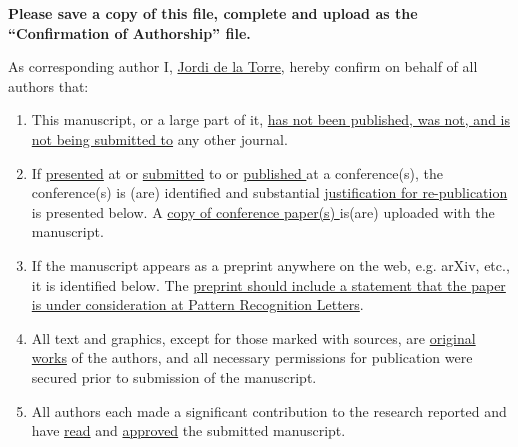 \documentclass[times,twocolumn,final,authoryear]{elsarticle}
\begin{document}
\thispagestyle{empty}
                                                             
\begin{table}[!th]

\begin{minipage}{.9\textwidth}
\baselineskip12pt
\ifpreprint
  \vspace*{1pc}
\else
  \vspace*{-6pc}
\fi

\vskip6pt


\vskip1pc


{\bf Please save a copy of this file, complete and upload as the 
``Confirmation of Authorship'' file.}

\vskip1pc

As corresponding author 
I, \underline{Jordi de la Torre}, 
hereby confirm on behalf of all authors that:

\vskip1pc

\begin{enumerate}
\itemsep=3pt
\item This manuscript, or a large part of it, \underline {has not been
published,  was not, and is not being submitted to} any other journal. 

\item If \underline {presented} at or \underline {submitted} to or
\underline  {published }at a conference(s), the conference(s) is (are)
identified and  substantial \underline {justification for
re-publication} is presented  below. A \underline {copy of
conference paper(s) }is(are) uploaded with the  manuscript.

\item If the manuscript appears as a preprint anywhere on the web, e.g.
arXiv,  etc., it is identified below. The \underline {preprint should
include a  statement that the paper is under consideration at Pattern
Recognition  Letters}.

\item All text and graphics, except for those marked with sources, are
\underline  {original works} of the authors, and all necessary
permissions for  publication were secured prior to submission of the
manuscript.

\item All authors each made a significant contribution to the research
reported  and have \underline {read} and \underline {approved} the
submitted  manuscript. 
\end{enumerate}


\end{minipage}
\end{table}
\end{document}
